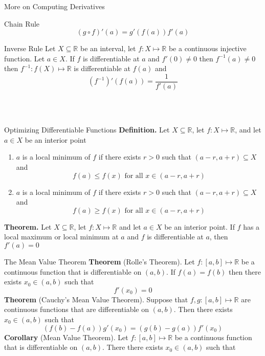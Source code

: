 \documentclass{article}
\newcommand{\real}{\mathbb{R}}
\begin{document}
\begin{multicols*}{3}
\begin{blackbox}{More on Computing Derivatives}
\begin{redbox}{Chain Rule}
        \[(g \circ f)'(a) = g'(f(a))f'(a)\]
    \end{redbox}
    \begin{brownbox}{Inverse Rule}
        Let $X \subseteq \real$ be an interval, let $f: X \mapsto \real$ be a continuous injective function. Let $a \in X$. If $f$ is differentiable at $a$ and $f'(0) \neq 0$ then $f^{-1}(a) \neq 0$ then $f^{-1}: f(X) \mapsto \real$ is differentiable at $f(a)$ and \\[-2ex]
        \[(f^{-1})'(f(a)) = \frac{1}{f'(a)}\]\\[-6ex]
    \end{brownbox}\\[-2ex]
\end{blackbox}
\begin{blackbox}{Optimizing Differentiable Functions}
    \textbf{Definition.} Let $X \subseteq \real$, let $f: X \mapsto \real$, and let $a \in X$ be an interior point
    \begin{enumerate}[label=(\roman*)]
        \item $a$ is a local minimum of $f$ if there exists $r > 0$ such that $(a-r, a+r) \subseteq X$ and \\[-2ex]
        \[f(a) \leq f(x) \text{ for all } x \in (a -r , a +r)\]
        \item $a$ is a local minimum of $f$ if there exists $r > 0$ such that $(a-r, a+r) \subseteq X$ and \\[-2ex]
        \[f(a) \geq f(x) \text{ for all } x \in (a -r , a +r)\]
    \end{enumerate}
    \textbf{Theorem.} Let $X \subseteq \real$, let $f: X \mapsto \real$ and let $a \in X$ be an interior point. If $f$ has a local maximum or local minimum at $a$ and $f$ is differentiable at $a$, then $f'(a) = 0$
    \begin{bluebox}{The Mean Value Theorem}
        \textbf{Theorem} (Rolle's Theorem).  Let $f: [a,b] \mapsto \real$ be a continuous function that is differentiable on $(a,b)$. If $f(a) = f(b)$ then there exists $x_0 \in (a,b)$ such that \\[-2ex]
        \[f'(x_0) = 0\]
        \textbf{Theorem} (Cauchy's Mean Value Theorem). Suppose that $f,g: [a,b] \mapsto \real$ are continuous functions that are differentiable on $(a,b)$. Then there exists $x_0 \in (a,b)$ such that \\[-2ex]
        \[(f(b) - f(a))g'(x_0) = (g(b)-g(a))f'(x_0)\]
        \textbf{Corollary} (Mean Value Theorem). Let $f: [a,b] \mapsto \real$ be a continuous function that is differentiable on $(a,b)$. There there exists $x_0 \in (a,b)$ such that 

\end{bluebox}
\end{blackbox}
\end{multicols*}
\end{document}
